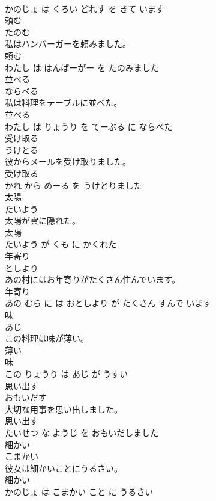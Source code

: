 \documentclass[8pt]{extreport}
\begin{document}
\begin{CJK}{UTF8}{min}
\\	かのじょ は くろい どれす を きて います			
\\	頼む	
\\	たのむ			
\\	私はハンバーガーを頼みました。	
\\	頼む 
\\	わたし は はんばーがー を たのみました			
\\	並べる	
\\	ならべる			
\\	私は料理をテーブルに並べた。	
\\	並べる 
\\	わたし は りょうり を てーぶる に ならべた			
\\	受け取る	
\\	うけとる			
\\	彼からメールを受け取りました。	
\\	受け取る 
\\	かれ から めーる を うけとりました			
\\	太陽	
\\	たいよう			
\\	太陽が雲に隠れた。	
\\	太陽 
\\	たいよう が くも に かくれた			
\\	年寄り	
\\	としより			
\\	あの村にはお年寄りがたくさん住んでいます。	
\\	年寄り 
\\	あの むら に は おとしより が たくさん すんで います			
\\	味	
\\	あじ			
\\	この料理は味が薄い。	
\\	薄い 
\\	味 
\\	この りょうり は あじ が うすい			
\\	思い出す	
\\	おもいだす			
\\	大切な用事を思い出しました。	
\\	思い出す 
\\	たいせつ な ようじ を おもいだしました			
\\	細かい	
\\	こまかい			
\\	彼女は細かいことにうるさい。	
\\	細かい 
\\	かのじょ は こまかい こと に うるさい			

\end{CJK}
\end{document}
